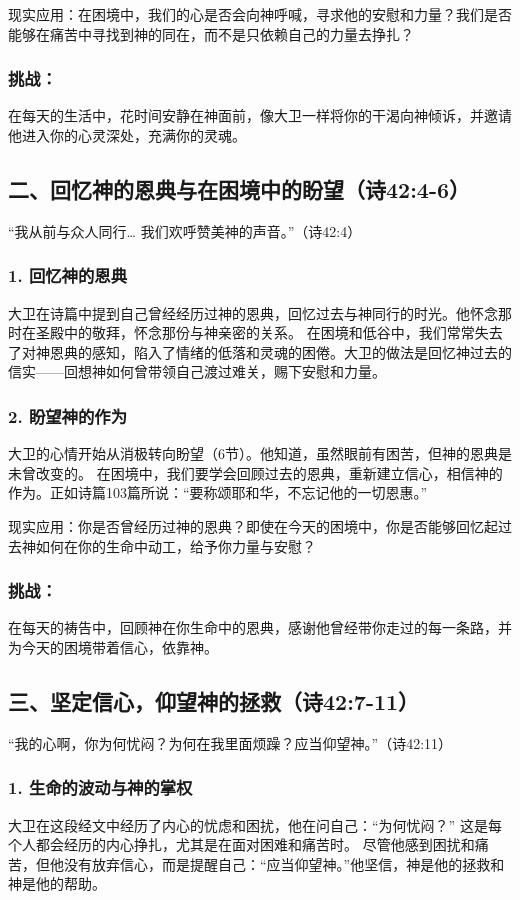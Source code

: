 \documentclass[a4paper, 12pt]{article}
\begin{document}
现实应用：在困境中，我们的心是否会向神呼喊，寻求他的安慰和力量？我们是否能够在痛苦中寻找到神的同在，而不是只依赖自己的力量去挣扎？
\subsubsection*{挑战：}

在每天的生活中，花时间安静在神面前，像大卫一样将你的干渴向神倾诉，并邀请他进入你的心灵深处，充满你的灵魂。
\subsection*{二、回忆神的恩典与在困境中的盼望（诗42:4-6）}
“我从前与众人同行… 我们欢呼赞美神的声音。”（诗42:4）

\subsubsection*{1. 回忆神的恩典}
\hspace{0.6cm}大卫在诗篇中提到自己曾经经历过神的恩典，回忆过去与神同行的时光。他怀念那时在圣殿中的敬拜，怀念那份与神亲密的关系。
在困境和低谷中，我们常常失去了对神恩典的感知，陷入了情绪的低落和灵魂的困倦。大卫的做法是回忆神过去的信实——回想神如何曾带领自己渡过难关，赐下安慰和力量。
\subsubsection*{2. 盼望神的作为}
\hspace{0.6cm}大卫的心情开始从消极转向盼望（6节）。他知道，虽然眼前有困苦，但神的恩典是未曾改变的。
在困境中，我们要学会回顾过去的恩典，重新建立信心，相信神的作为。正如诗篇103篇所说：“要称颂耶和华，不忘记他的一切恩惠。”

现实应用：你是否曾经历过神的恩典？即使在今天的困境中，你是否能够回忆起过去神如何在你的生命中动工，给予你力量与安慰？
\subsubsection*{挑战：}

在每天的祷告中，回顾神在你生命中的恩典，感谢他曾经带你走过的每一条路，并为今天的困境带着信心，依靠神。
\subsection*{三、坚定信心，仰望神的拯救（诗42:7-11）}
“我的心啊，你为何忧闷？为何在我里面烦躁？应当仰望神。”（诗42:11）

\subsubsection*{1. 生命的波动与神的掌权}
\hspace{0.6cm}大卫在这段经文中经历了内心的忧虑和困扰，他在问自己：“为何忧闷？” 这是每个人都会经历的内心挣扎，尤其是在面对困难和痛苦时。
尽管他感到困扰和痛苦，但他没有放弃信心，而是提醒自己：“应当仰望神。”他坚信，神是他的拯救和神是他的帮助。
\end{document}
